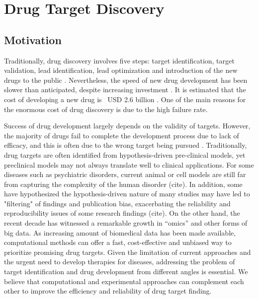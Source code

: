 \chapter{Drug Target Discovery}

\section{Motivation}
Traditionally, drug discovery involves five steps: target identification, target validation, lead identification, lead optimization and introduction of the new drugs to the public \cite{phoebe2008identifying}. Nevertheless, the speed of new drug development has been slower than anticipated, despite increasing investment \cite{pammolli2011productivity}. It is estimated that the cost of developing a new drug is ~USD 2.6 billion \cite{van1998socio}. One of the main reasons for the enormous cost of drug discovery is due to the high failure rate. 

Success of drug development largely depends on the validity of targets. However, the majority of drugs fail to complete the development process due to lack of efficacy, and this is often due to the wrong target being pursued \cite{shih2018drug}. Traditionally, drug targets are often identified from hypothesis-driven pre-clinical models, yet preclinical models may not always translate well to clinical applications. For some diseases such as psychiatric disorders, current animal or cell models are still far from capturing the complexity of the human disorder (cite). In addition, some have hypothesized the hypothesis-driven nature of many studies may have led to "filtering" of findings and publication bias, exacerbating the reliability and reproducibility issues of some research findings (cite). On the other hand, the recent decade has witnessed a remarkable growth in “omics” and other forms of big data. As increasing amount of biomedical data has been made available, computational methods can offer a fast, cost-effective and unbiased way to prioritize promising drug targets. Given the limitation of current approaches and the urgent need to develop therapies for diseases, addressing the problem of target identification and drug development from different angles is essential. We believe that computational and experimental approaches can complement each other to improve the efficiency and reliability of drug target finding. 
  
